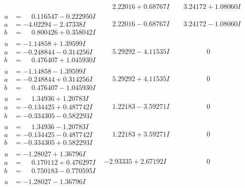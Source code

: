 \documentclass[1p]{elsarticle_modified}
\theoremstyle{definition}
\begin{document}
$$\begin{array}{c|c|c}
 & \phantom{-}2.22016 + 0.68767 I & \phantom{-}3.24172 + 1.08060 I \\ \hline\begin{aligned}
u &= \phantom{-}0.116547 - 0.222950 I \\
a &= -4.02294 - 2.47338 I \\
b &= \phantom{-}0.800426 + 0.358042 I\end{aligned}
 & \phantom{-}2.22016 - 0.68767 I & \phantom{-}3.24172 - 1.08060 I \\ \hline\begin{aligned}
u &= -1.14858 + 1.39599 I \\
a &= -0.248844 - 0.314256 I \\
b &= \phantom{-}0.476407 + 1.045930 I\end{aligned}
 & \phantom{-}5.29292 - 4.11535 I & \phantom{-0.000000 } 0 \\ \hline\begin{aligned}
u &= -1.14858 - 1.39599 I \\
a &= -0.248844 + 0.314256 I \\
b &= \phantom{-}0.476407 - 1.045930 I\end{aligned}
 & \phantom{-}5.29292 + 4.11535 I & \phantom{-0.000000 } 0 \\ \hline\begin{aligned}
u &= \phantom{-}1.34936 + 1.20783 I \\
a &= -0.134425 + 0.487742 I \\
b &= -0.334305 - 0.582293 I\end{aligned}
 & \phantom{-}1.22183 - 3.59271 I & \phantom{-0.000000 } 0 \\ \hline\begin{aligned}
u &= \phantom{-}1.34936 - 1.20783 I \\
a &= -0.134425 - 0.487742 I \\
b &= -0.334305 + 0.582293 I\end{aligned}
 & \phantom{-}1.22183 + 3.59271 I & \phantom{-0.000000 } 0 \\ \hline\begin{aligned}
u &= -1.28027 + 1.36796 I \\
a &= \phantom{-}0.170112 + 0.476297 I \\
b &= \phantom{-}0.750183 - 0.770595 I\end{aligned}
 & -2.93335 + 2.67192 I & \phantom{-0.000000 } 0 \\ \hline\begin{aligned}
u &= -1.28027 - 1.36796 I \\

\end{aligned}
\end{array}$$
\end{document}
